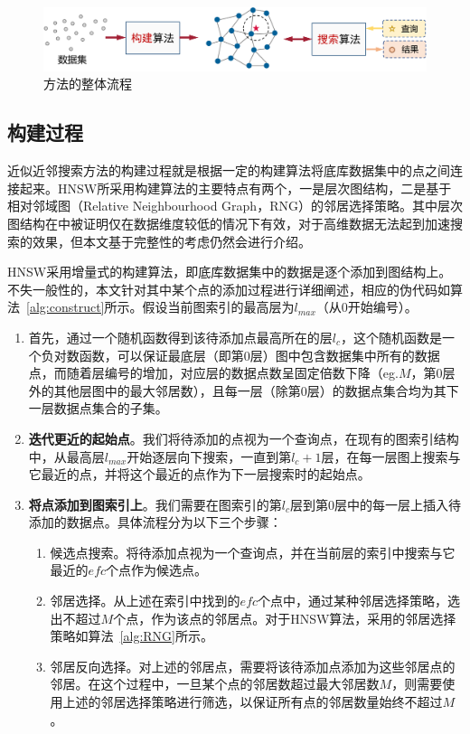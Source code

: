 \begin{figure}
  \centering
  \includegraphics[width=0.9\linewidth]{figures/Background/ganns.pdf}
  \caption{\ganns 方法的整体流程}
  \label{fig:ganns}
\end{figure}


\subsection{构建过程}
近似近邻搜索方法的构建过程就是根据一定的构建算法将底库数据集中的点之间连接起来。HNSW所采用构建算法的主要特点有两个，一是层次图结构，二是基于相对邻域图\cite{rng-1980}（Relative Neighbourhood Graph，RNG）的邻居选择策略。其中层次图结构在中被证明仅在数据维度较低的情况下有效，对于高维数据无法起到加速搜索的效果，但本文基于完整性的考虑仍然会进行介绍。


HNSW采用增量式的构建算法，即底库数据集中的数据是逐个添加到图结构上。不失一般性的，本文针对其中某个点的添加过程进行详细阐述，相应的伪代码如算法~\ref{alg:construct}所示。假设当前图索引的最高层为$l_{max}$（从0开始编号）。
\begin{enumerate}
    \item 首先，通过一个随机函数得到该待添加点最高所在的层$l_c$，这个随机函数是一个负对数函数，可以保证最底层（即第0层）图中包含数据集中所有的数据点，而随着层编号的增加，对应层的数据点数呈固定倍数下降（eg.$M$，第0层外的其他层图中的最大邻居数），且每一层（除第0层）的数据点集合均为其下一层数据点集合的子集。
    \item \textbf{迭代更近的起始点}。我们将待添加的点视为一个查询点，在现有的图索引结构中，从最高层$l_{max}$开始逐层向下搜索，一直到第$l_c+1$层，在每一层图上搜索与它最近的点，并将这个最近的点作为下一层搜索时的起始点。
    \item \textbf{将点添加到图索引上}。我们需要在图索引的第$l_c$层到第0层中的每一层上插入待添加的数据点。具体流程分为以下三个步骤： 
    \begin{enumerate}
        \item 候选点搜索。将待添加点视为一个查询点，并在当前层的索引中搜索与它最近的$efc$个点作为候选点。
        \item 邻居选择。从上述在索引中找到的$efc$个点中，通过某种邻居选择策略，选出不超过$M$个点，作为该点的邻居点。对于HNSW算法，采用的邻居选择策略如算法~\ref{alg:RNG}所示。
        \item 邻居反向选择。对上述的邻居点，需要将该待添加点添加为这些邻居点的邻居。在这个过程中，一旦某个点的邻居数超过最大邻居数$M$，则需要使用上述的邻居选择策略进行筛选，以保证所有点的邻居数量始终不超过$M$。
    \end{enumerate}
\end{enumerate}



